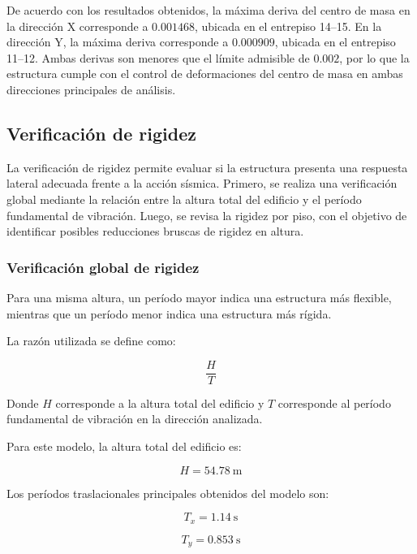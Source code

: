De acuerdo con los resultados obtenidos, la máxima deriva del centro de masa en la dirección X corresponde a $0.001468$, ubicada en el entrepiso 14--15. En la dirección Y, la máxima deriva corresponde a $0.000909$, ubicada en el entrepiso 11--12. Ambas derivas son menores que el límite admisible de $0.002$, por lo que la estructura cumple con el control de deformaciones del centro de masa en ambas direcciones principales de análisis.

\subsection{Verificación de rigidez}

La verificación de rigidez permite evaluar si la estructura presenta una respuesta lateral adecuada frente a la acción sísmica. Primero, se realiza una verificación global mediante la relación entre la altura total del edificio y el período fundamental de vibración. Luego, se revisa la rigidez por piso, con el objetivo de identificar posibles reducciones bruscas de rigidez en altura.

\subsubsection{Verificación global de rigidez}

Para una misma altura, un período mayor indica una estructura más flexible, mientras que un período menor indica una estructura más rígida.

La razón utilizada se define como:

\begin{equation}
\frac{H}{T}
\end{equation}

Donde $H$ corresponde a la altura total del edificio y $T$ corresponde al período fundamental de vibración en la dirección analizada.

Para este modelo, la altura total del edificio es:

\begin{equation}
H = 54.78 \ \text{m}
\end{equation}

Los períodos traslacionales principales obtenidos del modelo son:

\begin{equation}
T_x = 1.14 \ \text{s}
\end{equation}

\begin{equation}
T_y = 0.853 \ \text{s}
\end{equation}

